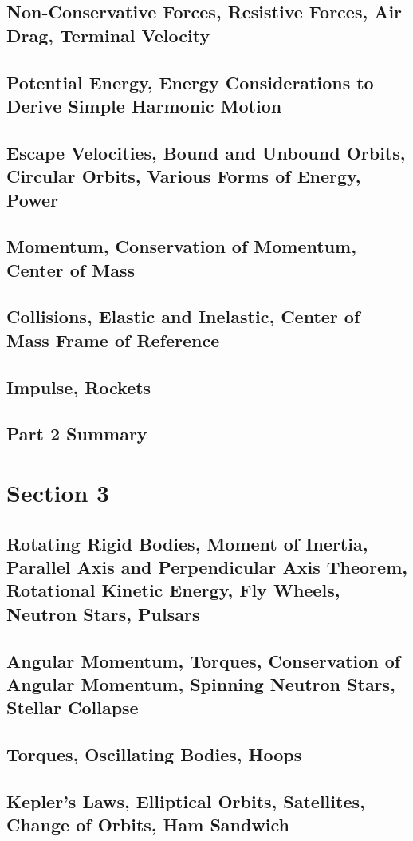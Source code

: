 \documentclass[../introphysics.tex]{subfiles}
\begin{document}
\section{Non-Conservative Forces, Resistive Forces, Air Drag, Terminal Velocity}
\section{Potential Energy, Energy Considerations to Derive Simple Harmonic Motion}
\section{Escape Velocities, Bound and Unbound Orbits, Circular Orbits, Various Forms of Energy, Power}
\section{Momentum, Conservation of Momentum, Center of Mass}
\section{Collisions, Elastic and Inelastic, Center of Mass Frame of Reference}
\section{Impulse, Rockets}
\section{Part 2 Summary}
\chapter{Section 3}
\section{Rotating Rigid Bodies, Moment of Inertia, Parallel Axis and Perpendicular Axis Theorem, Rotational Kinetic Energy, Fly Wheels, Neutron Stars, Pulsars}
\section{Angular Momentum, Torques, Conservation of Angular Momentum, Spinning Neutron Stars, Stellar Collapse}
\section{Torques, Oscillating Bodies, Hoops}
\section{Kepler's Laws, Elliptical Orbits, Satellites, Change of Orbits, Ham Sandwich}
\end{document}
